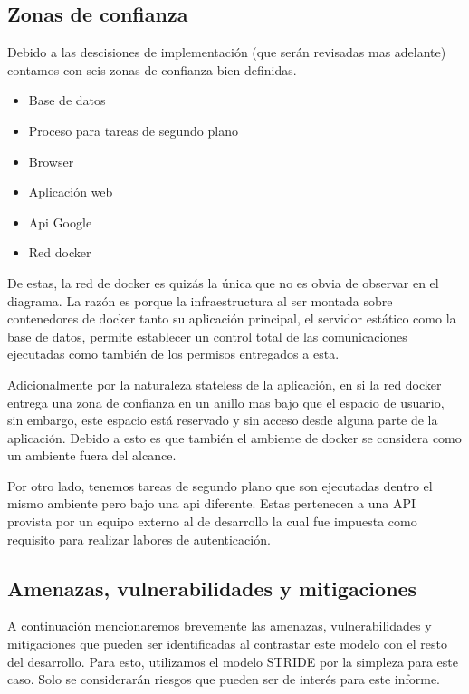 \subsection{Zonas de confianza}

Debido a las descisiones de implementación (que serán revisadas mas adelante) contamos con seis zonas de confianza bien definidas.

\begin{itemize}
    \item Base de datos
    \item Proceso para tareas de segundo plano
    \item Browser
    \item Aplicación web
    \item Api Google
    \item Red docker
\end{itemize}

De estas, la red de docker es quizás la única que no es obvia de observar en el diagrama. La razón es porque la infraestructura al ser montada sobre contenedores de docker tanto su aplicación principal, el servidor estático como la base de datos, permite establecer un control total de las comunicaciones ejecutadas como también de los permisos entregados a esta.

Adicionalmente por la naturaleza stateless de la aplicación, en si la red docker entrega una zona de confianza en un anillo mas bajo que el espacio de usuario, sin embargo, este espacio está reservado y sin acceso desde alguna parte de la aplicación. Debido a esto es que también el ambiente de docker se considera como un ambiente fuera del alcance.

Por otro lado, tenemos tareas de segundo plano que son ejecutadas dentro el mismo ambiente pero bajo una api diferente. Estas pertenecen a una API provista por un equipo externo al de desarrollo la cual fue impuesta como requisito para realizar labores de autenticación.

\subsection{Amenazas, vulnerabilidades y mitigaciones}

A continuación mencionaremos brevemente las amenazas, vulnerabilidades y mitigaciones que pueden ser identificadas al contrastar este modelo con el resto del desarrollo. Para esto, utilizamos el modelo STRIDE por la simpleza para este caso. Solo se considerarán riesgos que pueden ser de interés para este informe.

